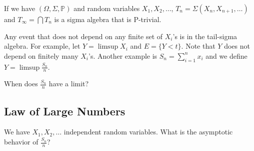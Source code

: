 \documentclass[11pt]{scrartcl}
\renewcommand{\P}{\mathbb{P}}
\begin{document}
If we have $(\Omega, \Sigma, \P)$ and random variables $X_1, X_2, \dots$, $T_n = \Sigma(X_n, X_{n+1}, \dots)$ and $T_\infty = \bigcap T_n$ is a sigma algebra that is P-trivial.

Any event that does not depend on any finite set of $X_i$'s is in the tail-sigma algebra.  For example, let $Y = \limsup X_i$ and $E = \{Y < t\}$.  Note that $Y$ does not depend on finitely many $X_i$'s.  Another example is $S_n = \sum_{i=1}^n x_i$ and we define $Y = \limsup \frac{S_n}{n}$.

When does $\frac{S_n}{n}$ have a limit?

\subsection{Law of Large Numbers}
We have $X_1, X_2, \dots$ independent random variables.  What is the asymptotic behavior of $\frac{S_n}{n}$?
\end{document}
